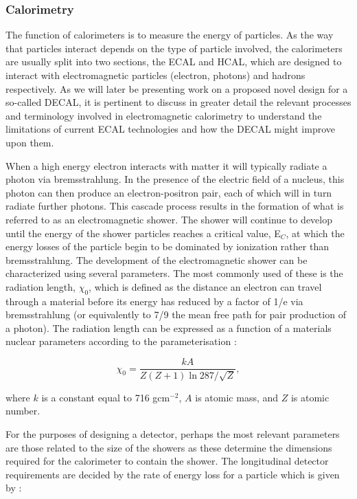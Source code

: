 \subsubsection{Calorimetry}
\label{det:ecal}
The function of calorimeters is to measure the energy of particles. As the way that particles interact depends on the type of particle involved, the calorimeters are usually split into two sections, the \ac{ECAL} and \ac{HCAL}, which are designed to interact with electromagnetic particles (electron, photons) and hadrons respectively. As we will later be presenting work on a proposed novel design for a so-called \ac{DECAL}, it is pertinent to discuss in greater detail the relevant processes and terminology involved in electromagnetic calorimetry to understand the limitations of current \ac{ECAL} technologies and how the \ac{DECAL} might improve upon them.

When a high energy electron interacts with matter it will typically radiate a photon via bremsstrahlung. In the presence of the electric field of a nucleus, this photon can then produce an electron-positron pair, each of which will in turn radiate further photons. This cascade process results in the formation of what is referred to as an electromagnetic shower. The shower will continue to develop until the energy of the shower particles reaches a critical value, E$_{C}$, at which the energy losses of the particle begin to be dominated by ionization rather than bremsstrahlung. The development of the electromagnetic shower can be characterized using several parameters. The most commonly used of these is the radiation length, $\chi_0$, which is defined as the distance an electron can travel through a material before its energy has reduced by a factor of 1/e via bremsstrahlung (or equivalently to 7/9 the mean free path for pair production of a photon). The radiation length can be expressed as a function of a materials nuclear parameters according to the parameterisation \cite{Patrignani:2016xqp}:

\begin{equation}
  \chi_0= \frac{kA}{Z(Z+1)\ln{287/\sqrt{Z}}},
\end{equation}

where $k$ is a constant equal to 716 gcm$^{-2}$, $A$ is atomic mass, and $Z$ is atomic number.

For the purposes of designing a detector, perhaps the most relevant parameters are those related to the size of the showers as these determine the dimensions required for the calorimeter to contain the shower. The longitudinal detector requirements are decided by the rate of energy loss for a particle which is given by \cite{Patrignani:2016xqp}:

